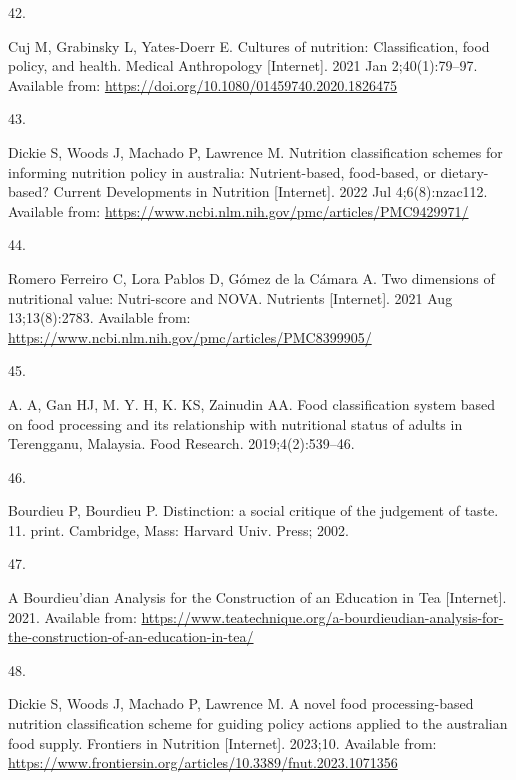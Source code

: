 \documentclass[
]{article}
\newlength{\cslhangindent}
\newlength{\csllabelwidth}
\newlength{\cslentryspacingunit} %
\newenvironment{CSLReferences}[2] %
 {%
  \setlength{\parindent}{0pt}
  \ifodd #1
  \let\oldpar\par
  \def\par{\hangindent=\cslhangindent\oldpar}
  \fi
  \setlength{\parskip}{#2\cslentryspacingunit}
 }%
 {}
\newcommand{\CSLLeftMargin}[1]{\parbox[t]{\csllabelwidth}{#1}}
\newcommand{\CSLRightInline}[1]{\parbox[t]{\linewidth - \csllabelwidth}{#1}\break}
\begin{document}
\begin{CSLReferences}{0}{0}
\leavevmode{}%
\CSLLeftMargin{42. }%
\CSLRightInline{Cuj M, Grabinsky L, Yates-Doerr E. Cultures of
nutrition: Classification, food policy, and health. Medical Anthropology
{[}Internet{]}. 2021 Jan 2;40(1):79--97. Available from:
\url{https://doi.org/10.1080/01459740.2020.1826475}}

\leavevmode{}%
\CSLLeftMargin{43. }%
\CSLRightInline{Dickie S, Woods J, Machado P, Lawrence M. Nutrition
classification schemes for informing nutrition policy in australia:
Nutrient-based, food-based, or dietary-based? Current Developments in
Nutrition {[}Internet{]}. 2022 Jul 4;6(8):nzac112. Available from:
\url{https://www.ncbi.nlm.nih.gov/pmc/articles/PMC9429971/}}

\leavevmode{}%
\CSLLeftMargin{44. }%
\CSLRightInline{Romero Ferreiro C, Lora Pablos D, Gómez de la Cámara A.
Two dimensions of nutritional value: Nutri-score and NOVA. Nutrients
{[}Internet{]}. 2021 Aug 13;13(8):2783. Available from:
\url{https://www.ncbi.nlm.nih.gov/pmc/articles/PMC8399905/}}

\leavevmode{}%
\CSLLeftMargin{45. }%
\CSLRightInline{A. A, Gan HJ, M. Y. H, K. KS, Zainudin AA. Food
classification system based on food processing and its relationship with
nutritional status of adults in Terengganu, Malaysia. Food Research.
2019;4(2):539--46. }

\leavevmode{}%
\CSLLeftMargin{46. }%
\CSLRightInline{Bourdieu P, Bourdieu P. Distinction: a social critique
of the judgement of taste. 11. print. Cambridge, Mass: Harvard Univ.
Press; 2002. }

\leavevmode{}%
\CSLLeftMargin{47. }%
\CSLRightInline{A Bourdieu{'}dian Analysis for the Construction of an
Education in Tea {[}Internet{]}. 2021. Available from:
\url{https://www.teatechnique.org/a-bourdieudian-analysis-for-the-construction-of-an-education-in-tea/}}

\leavevmode{}%
\CSLLeftMargin{48. }%
\CSLRightInline{Dickie S, Woods J, Machado P, Lawrence M. A novel food
processing-based nutrition classification scheme for guiding policy
actions applied to the australian food supply. Frontiers in Nutrition
{[}Internet{]}. 2023;10. Available from:
\url{https://www.frontiersin.org/articles/10.3389/fnut.2023.1071356}}


\end{CSLReferences}
\end{document}
